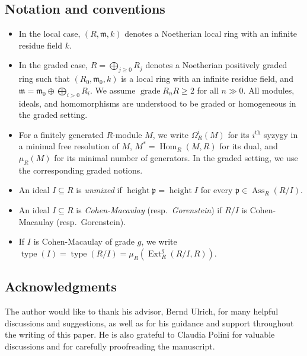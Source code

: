 \documentclass[11pt,letterpaper]{amsart}
\DeclareMathOperator{\type}{type}
\DeclareMathOperator{\h}{Hom}
\DeclareMathOperator{\Ext}{Ext}
\DeclareMathOperator{\Ass}{Ass}
\DeclareMathOperator{\gr}{grade}
\DeclareMathOperator{\height}{height}
\theoremstyle{plain}
\theoremstyle{definition}
\theoremstyle{remark}
\begin{document}
\subsection{Notation and conventions}
\begin{itemize}
    \item[$(i)$] In the local case, $(R,\mathfrak m,k)$ denotes a Noetherian local ring with an infinite residue field $k$. 
    \item[$(ii)$] In the graded case, $R=\bigoplus_{j\geq 0}R_j$ denotes a Noetherian positively graded ring such that $(R_0,\mathfrak m_0,k)$ is a local ring with an infinite residue field, and $\mathfrak m=\mathfrak m_0\oplus\bigoplus_{i>0}R_i$. We assume $\gr R_nR\geq 2$ for all $n\gg0$. All modules, ideals, and homomorphisms are understood to be graded or homogeneous in the graded setting.    
    \item[$(iii)$] For a finitely generated $R$-module $M$, we write $\Omega_R^i(M)$ for its $i^\text{th}$ syzygy in a minimal free resolution of $M$, $M^*=\h_R(M,R)$ for its dual, and $\mu_R(M)$ for its minimal number of generators. In the graded setting, we use the corresponding graded notions.
    
    \item[$(iv)$] An ideal $I\subseteq R$ is \emph{unmixed} if $\height \mathfrak p=\height I$ for every $\mathfrak p\in\Ass_R(R/I)$.
    
    \item[$(v)$] An ideal $I\subseteq R$ is \emph{Cohen-Macaulay} (resp.\ \emph{Gorenstein}) if $R/I$ is Cohen-Macaulay (resp.\ Gorenstein).
    
    \item[$(vi)$] If $I$ is Cohen-Macaulay of grade $g$, we write $\type(I)=\type(R/I)=\mu_R(\Ext_R^g(R/I,R))$. 
\end{itemize}

\subsection{Acknowledgments}
The author would like to thank his advisor, Bernd Ulrich, for many helpful discussions and suggestions, as well as for his guidance and support throughout the writing of this paper.  He is also grateful to Claudia Polini for valuable discussions and for carefully proofreading the manuscript.
\end{document}
